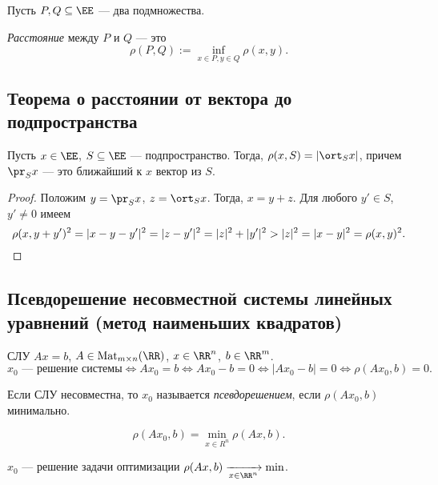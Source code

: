 Пусть $P, Q \subseteq \EE$ --- два подмножества.

\begin{definition}
    \textit{Расстояние} между $P$ и $Q$ --- это
    \begin{equation*}
        \rho(P, Q) := \inf_{x \in P, y \in Q} \rho(x, y)
    .\end{equation*}
\end{definition}


\subsection{Теорема о расстоянии от вектора до подпространства}

\begin{theorem}
    Пусть $x \in \EE$, $S \subseteq \EE$ --- подпространство. Тогда, $\rho(x, S) = \left|\ort_S x\right|$, причем $\pr_S x$ --- это ближайший к $x$ вектор из $S$.
\end{theorem}

\begin{proof}
    Положим $y = \pr_S x$, $z = \ort_S x$. Тогда, $x = y + z$.
    Для любого $y' \in S$, $y' \neq 0$ имеем
    \begin{equation*}
        \rho(x, y + y')^2 = |x - y - y'|^2 = |z - y'|^2 = |z|^2 + |y'|^2 > |z|^2 = |x - y|^2 = \rho(x, y)^2
    .\qedhere\end{equation*}
\end{proof}


\subsection{Псевдорешение несовместной системы линейных уравнений (метод наименьших квадратов)}

СЛУ $Ax = b$, $A \in \text{Mat}_{m \times n}(\RR)$, $x \in \RR^n$, $b \in \RR^m$.
\begin{equation*}
    x_0 \text{ --- решение системы} \iff Ax_0 = b \iff Ax_0 - b = 0 \iff |Ax_0 - b| = 0 \iff \rho(Ax_0, b) = 0
.\end{equation*}

Если СЛУ несовместна, то $x_0$ называется \textit{псевдорешением}, если $\rho(Ax_0, b)$ минимально.

\begin{equation*}
    \rho(Ax_0, b) = \min_{x \in R^n} \rho(Ax, b)
.\end{equation*}

$x_0$ --- решение задачи оптимизации $\rho(Ax, b) \xrightarrow[x \in \RR^n]{} \min$.
